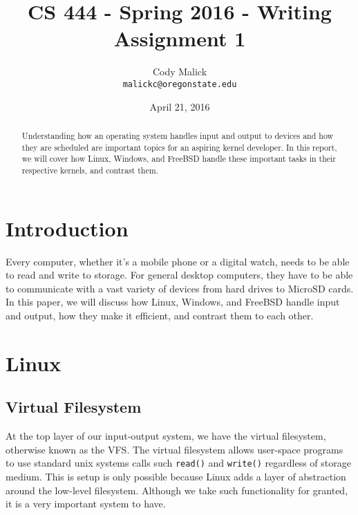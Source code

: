 \documentclass[10pt,letterpaper,onecolumn,draftclsnofoot]{IEEEtran}
\begin{document}
\begin{titlepage}
  \title{CS 444 - Spring 2016 - Writing Assignment 1}
  \author{Cody Malick\\
  \texttt{malickc@oregonstate.edu}}
  \date{April 21, 2016}
  \maketitle
  \vspace*{4cm}
  \begin{abstract}
      \noindent Understanding how an operating system handles input and output
      to devices and how they are scheduled are important topics for an aspiring
      kernel developer. In this report, we will cover how Linux, Windows, and
      FreeBSD handle these important tasks in their respective kernels,
      and contrast them.
  \end{abstract}
\end{titlepage}

\tableofcontents
\clearpage
\section{Introduction}
Every computer, whether it's a mobile phone or a digital watch, needs to be able
to read and write to storage. For general desktop computers, they have to be able
to communicate with a vast variety of devices from hard drives to MicroSD cards.
In this paper, we will discuss how Linux, Windows, and FreeBSD handle input and
output, how they make it efficient, and contrast them to each other.
\section{Linux}
  \subsection{Virtual Filesystem}
  At the top layer of our input-output system, we have the virtual filesystem,
  otherwise known as the VFS. The virtual filesystem allows user-space programs
  to use standard unix systems calls such \texttt{read()} and \texttt{write()}
  regardless of storage medium. This is setup is only possible because Linux
  adds a layer of abstraction around the low-level filesystem. Although we take
  such functionality for granted, it is a very important system to have.
  \cite{robertlove2010}
\end{document}
